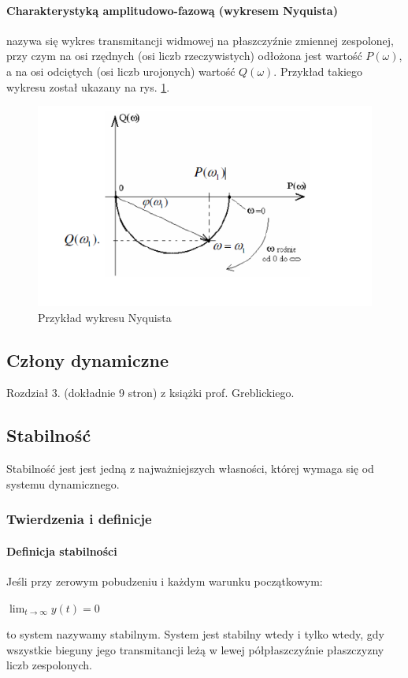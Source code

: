 \documentclass[a4paper,twoside]{report}
\begin{document}
\paragraph{Charakterystyką amplitudowo-fazową (wykresem Nyquista)} nazywa się wykres
transmitancji widmowej na płaszczyźnie zmiennej zespolonej, przy czym na osi
rzędnych (osi liczb rzeczywistych) odłożona jest wartość $P(\omega)$, a na osi
odciętych (osi liczb urojonych) wartość $Q(\omega)$. Przykład takiego wykresu został ukazany na rys. \ref{rys:dynamiczne_wykres_nyquista}.
\begin{figure}[htbp]
	\centering
	\includegraphics[scale=0.7]{obrazy/dynamiczne/nyquist.png}
	\caption{Przykład wykresu Nyquista}
	\label{rys:dynamiczne_wykres_nyquista}
\end{figure}

\subsection{Człony dynamiczne}
Rozdział 3. (dokładnie 9 stron) z książki prof. Greblickiego.

\subsection{Stabilność}
Stabilność jest jest jedną z najważniejszych własności, której wymaga się od systemu dynamicznego.

\subsubsection{Twierdzenia i definicje}
\paragraph{Definicja stabilności\\} Jeśli przy zerowym pobudzeniu i każdym warunku początkowym:
\begin{center}
	$ \lim_{t\to\infty}y(t)=0 $
\end{center}
to system nazywamy stabilnym.
System jest stabilny wtedy i tylko wtedy, gdy wszystkie bieguny jego transmitancji leżą w lewej półpłaszczyźnie płaszczyzny liczb zespolonych.
\end{document}
